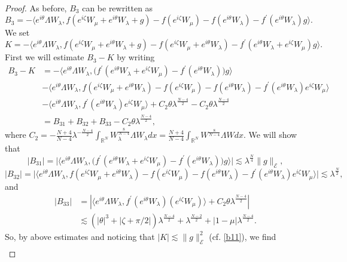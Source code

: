 \documentclass[a4paper,two-side,10pt]{amsart}
\newcommand{\R}{\mathbb{R}}
\numberwithin{equation}{section}
\begin{document}
\begin{proof}
As before, $B_3$ can be rewritten as 
$$B_3 =-  \langle  e^{i\theta}  \Lambda W_\lambda ,  f(e^{i\zeta} W_\mu +e^{i\theta} W_\lambda +g) - f(e^{i\zeta} W_\mu) - f(e^{i\theta} W_\lambda) -f^\prime (e^{i\theta} W_\lambda) g \rangle .$$
We set
$$K= - \langle  e^{i\theta}  \Lambda W_\lambda ,  f(e^{i\zeta} W_\mu +e^{i\theta} W_\lambda +g) - f(e^{i\zeta} W_\mu +e^{i\theta} W_\lambda) -f^\prime (e^{i\theta} W_\lambda +e^{i\zeta} W_\mu) g \rangle .$$
 First we will estimate $B_3 - K$ by writing
\begin{align*}
B_3 - K&=- \big\langle  e^{i\theta}  \Lambda W_\lambda , \big( f^\prime (e^{i\theta} W_\lambda +e^{i\zeta} W_\mu) - f^\prime (e^{i\theta} W_\lambda )\big) g \big\rangle  \\
& - \langle  e^{i\theta}  \Lambda W_\lambda ,  f(e^{i\zeta} W_\mu +e^{i\theta} W_\lambda ) - f(e^{i\zeta} W_\mu) -f(e^{i\theta} W_\lambda)-f^\prime (e^{i\theta} W_\lambda) e^{i\zeta} W_\mu \rangle  \\
&- \langle e^{i\theta} \Lambda W_\lambda , f^\prime (e^{i\theta} W_\lambda) e^{i\zeta} W_\mu \rangle + C_2 \theta \lambda^{\frac{N-4}{2}} -C_2 \theta \lambda^{\frac{N-4}{2}} \\
&= B_{31}+B_{32}+ B_{33}- C_2 \theta \lambda^{\frac{N-4}{2}},
\end{align*}
where $C_2=- \frac{N+4}{N-4} \lambda^{-\frac{N-4}{2}} \int_{\R^N} W_\lambda^{\frac{8}{N-4}} \Lambda W_\lambda dx= \frac{N+4}{N-4} \int_{\R^N} W^{\frac{8}{N-4}} \Lambda W dx $. We will show that
$$ |B_{31}|= \big| \big\langle  e^{i\theta}  \Lambda W_\lambda , \big( f^\prime (e^{i\theta} W_\lambda +e^{i\zeta} W_\mu) - f^\prime (e^{i\theta} W_\lambda )\big) g \big\rangle \big| \lesssim \lambda^{\frac{N}{4} } \|g\|_{\mathcal{E}},$$
$$|B_{32}|=\big|\langle  e^{i\theta}  \Lambda W_\lambda ,  f(e^{i\zeta} W_\mu +e^{i\theta} W_\lambda ) - f(e^{i\zeta} W_\mu) -f(e^{i\theta} W_\lambda) - f^\prime (e^{i\theta} W_\lambda) e^{i\zeta} W_\mu\rangle \big| \lesssim \lambda^{\frac{N}{2}},$$
and
\begin{align*}
|B_{33}|&=|\langle e^{i\theta} \Lambda W_\lambda , f^\prime (e^{i\theta} W_\lambda) (e^{i\zeta} W_\mu)\rangle + C_2 \theta \lambda^{\frac{N-4}{2}}|\\
&\lesssim   ( |\theta|^3 + |\zeta +\pi/2| ) \lambda^{\frac{N-4}{2}} +  \lambda^{\frac{N-2}{2}} +|1-\mu| \lambda^{\frac{N-4}{2}}.
\end{align*}
So, by above estimates and noticing that $|K|\lesssim  \|g\|^2_{\mathcal{E}} $ (cf. \eqref{b11}), we find
\begin{align*}

\end{align*}
\end{proof}
\end{document}
